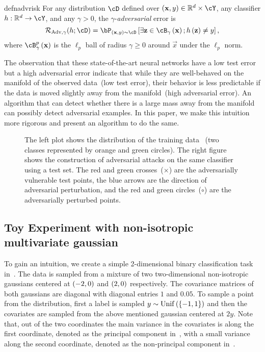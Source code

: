 \begin{restatable}{defn}{advrisk}\label{defn:adv_risk} For any distribution $\cD$
  defined over $\br{\vec{x},y}\in\reals^d\times\cY$, any classifier
  $h:\reals^d\rightarrow\cY$, and any $\gamma>0$, 
  the $\gamma$-\emph{adversarial} error is 
          \begin{equation} 
              \radv{\gamma}{h;\cD}=\bP_{\br{\vec{x},y} 
              \sim\cD}\bs{\exists \vec{z}\in\cB_{\gamma}
              \br{\vec{x}};h\br{\vec{z}}\neq y},
          \end{equation} 
  where $\cB_\gamma^p\br{\vec{x}}$ is the $\ell_p$ ball of radius $\gamma \ge
  0$ around $\vec{x}$ under the $\ell_p$ norm.
\end{restatable}

The observation that these state-of-the-art neural networks have a low test
error but a high adversarial error indicate that while they are well-behaved on
the manifold of the observed data~(low test error), their behavior is less
predictable if the data is moved slightly away from the manifold~(high
adversarial error). An algorithm that can detect whether there is a large mass away from the manifold can possibly detect adversarial examples. In this paper, we make this intuition more rigorous and present an algorithm to do the same.

\begin{figure}[t]
  \centering
  \def\svgwidth{0.99\columnwidth}
  
  \caption{The left plot shows the distribution of the training data ~(two
  classes represented by {\color{orange} orange} and {\color{green} green}
  circles). The right figure shows the construction of adversarial attacks on
  the same classifier using a test set. The {\color{red} red} and
  {\color{green} green} crosses~(\(\times \)) are the adversarially vulnerable
  test points, the {\color{blue} blue arrows} are the direction of adversarial
  perturbation, and the {\color{red} red} and {\color{green} green}
  circles~(\(\circ\)) are the adversarially perturbed points.}
  \label{fig:dir-adv-att}
\end{figure}

\subsection{Toy Experiment with non-isotropic multivariate gaussian}
To gain an intuition, we create a simple 2-dimensional binary classification
task in~. The data is sampled from a mixture of two
two-dimensional non-isotropic gaussians centered at \(\left({-2,0}\right)\) and
\(\left({2,0}\right)\) respectively. The covariance matrices of both gaussians are
diagonal with diagonal entries \(1\) and  \(0.05\). To sample a point from the
distribution, first a label is sampled \(y\sim\mathrm{Unif}\left({\left\{{-1,1}\right\}}\right)\) and
then the covariates are sampled from the above mentioned gaussian centered at
\(2y\). Note that, out of the two coordinates the main variance in the
covariates is along the first coordinate, denoted as the {\emph principal
component} in~, with a small variance along the second
coordinate, denoted as the non-principal component in~.

